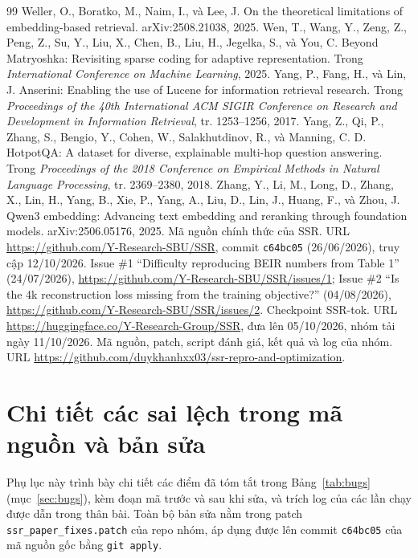 \documentclass[a4paper,13pt]{extreport}
\newcommand{\RepoNhom}{https://github.com/duykhanhxx03/ssr-repro-and-optimization}
\theoremstyle{plain}
\newcommand{\ssr}{SSR}
\begin{document}
\begin{thebibliography}{99}
 Weller, O., Boratko, M., Naim, I., và Lee, J. On the theoretical limitations of embedding-based retrieval. arXiv:2508.21038, 2025.
 Wen, T., Wang, Y., Zeng, Z., Peng, Z., Su, Y., Liu, X., Chen, B., Liu, H., Jegelka, S., và You, C. Beyond Matryoshka: Revisiting sparse coding for adaptive representation. Trong \emph{International Conference on Machine Learning}, 2025.
 Yang, P., Fang, H., và Lin, J. Anserini: Enabling the use of Lucene for information retrieval research. Trong \emph{Proceedings of the 40th International ACM SIGIR Conference on Research and Development in Information Retrieval}, tr. 1253--1256, 2017.
 Yang, Z., Qi, P., Zhang, S., Bengio, Y., Cohen, W., Salakhutdinov, R., và Manning, C. D. HotpotQA: A dataset for diverse, explainable multi-hop question answering. Trong \emph{Proceedings of the 2018 Conference on Empirical Methods in Natural Language Processing}, tr. 2369--2380, 2018.
 Zhang, Y., Li, M., Long, D., Zhang, X., Lin, H., Yang, B., Xie, P., Yang, A., Liu, D., Lin, J., Huang, F., và Zhou, J. Qwen3 embedding: Advancing text embedding and reranking through foundation models. arXiv:2506.05176, 2025.
 Mã nguồn chính thức của \ssr. URL \url{https://github.com/Y-Research-SBU/SSR}, commit \texttt{c64bc05} (26/06/2026), truy cập 12/10/2026. Issue \#1 ``Difficulty reproducing BEIR numbers from Table 1'' (24/07/2026), \url{https://github.com/Y-Research-SBU/SSR/issues/1}; Issue \#2 ``Is the 4k reconstruction loss missing from the training objective?'' (04/08/2026), \url{https://github.com/Y-Research-SBU/SSR/issues/2}.
 Checkpoint \ssr-tok. URL \url{https://huggingface.co/Y-Research-Group/SSR}, đưa lên 05/10/2026, nhóm tải ngày 11/10/2026.
 Mã nguồn, patch, script đánh giá, kết quả và log của nhóm. URL \url{\RepoNhom}.
\end{thebibliography}

\appendix
{}

\chapter{Chi tiết các sai lệch trong mã nguồn và bản sửa}
\label{app:fixes}
Phụ lục này trình bày chi tiết các điểm đã tóm tắt trong Bảng~\ref{tab:bugs} (mục~\ref{sec:bugs}), kèm đoạn mã trước và sau khi sửa, và trích log của các lần chạy được dẫn trong thân bài. Toàn bộ bản sửa nằm trong patch \texttt{ssr\_paper\_fixes.patch} của repo nhóm, áp dụng được lên commit \texttt{c64bc05} của mã nguồn gốc bằng \texttt{git apply}.
\end{document}
